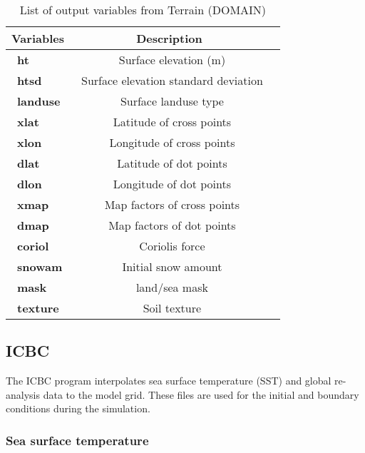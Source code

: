 \begin{table}[h]
\begin{center}
\caption{List of output variables from Terrain (DOMAIN)}  \label{ter_var}
\vspace{0.25cm}
\begin{tabular}{|l|c|l|} \hline \hline
{\small {\bf Variables}} & {\small {\bf Description}} \\ \hline \hline
{\ {\bf ht}}    & {\ {Surface elevation (m)} }      \\ \hline
{\ {\bf htsd}}    & {\ {Surface elevation standard deviation} }    \\ \hline
{\ {\bf landuse}}    & {\ {Surface landuse type}}       \\ \hline
{\ {\bf xlat}}    & {\ {Latitude of cross points} }      \\ \hline
{\ {\bf xlon}}    & {\ {Longitude of cross points}}   \\ \hline
{\ {\bf dlat}}    & {\ {Latitude of dot points}}       \\ \hline
{\ {\bf dlon}}    & {\ {Longitude of dot points} }      \\ \hline
{\ {\bf xmap}}    & {\ {Map factors of cross points} }     \\ \hline
{\ {\bf dmap}}    & {\ {Map factors of dot points}}       \\ \hline
{\ {\bf coriol}}    & {\ {Coriolis force} }      \\ \hline
{\ {\bf snowam}}    & {\ {Initial snow amount} }     \\ \hline
{\ {\bf mask}}    & {\ {land/sea mask} }     \\ \hline
{\ {\bf texture}}    & {\ {Soil texture} }     \\ \hline
\end{tabular}
\end{center}
\end{table}

\subsection{ICBC}
The ICBC program interpolates sea surface temperature (SST) and global re-analysis data to the model grid.  These files are used for the initial and boundary conditions during the simulation. 

\subsubsection{Sea surface temperature}     

